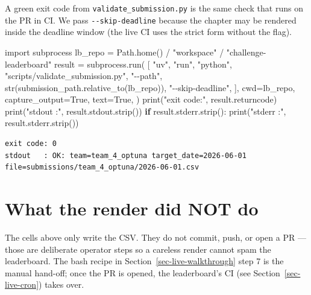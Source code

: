 \documentclass[
  english,
  letterpaper,
]{scrbook}
\newenvironment{Shaded}{\begin{snugshade}}{\end{snugshade}}
\newcommand{\BuiltInTok}[1]{\textcolor[rgb]{0.00,0.23,0.31}{#1}}
\newcommand{\ControlFlowTok}[1]{\textcolor[rgb]{0.00,0.23,0.31}{\textbf{#1}}}
\newcommand{\ImportTok}[1]{\textcolor[rgb]{0.00,0.46,0.62}{#1}}
\newcommand{\NormalTok}[1]{\textcolor[rgb]{0.00,0.23,0.31}{#1}}
\newcommand{\OperatorTok}[1]{\textcolor[rgb]{0.37,0.37,0.37}{#1}}
\newcommand{\StringTok}[1]{\textcolor[rgb]{0.13,0.47,0.30}{#1}}
\newcommand{\VariableTok}[1]{\textcolor[rgb]{0.07,0.07,0.07}{#1}}
\begin{document}
A green exit code from \texttt{validate\_submission.py} is the same
check that runs on the PR in CI. We pass \texttt{-\/-skip-deadline}
because the chapter may be rendered inside the deadline window (the live
CI uses the strict form without the flag).

\protect{}\label{live-validate}
\begin{Shaded}
\begin{Highlighting}[]
\ImportTok{import}\NormalTok{ subprocess}
\NormalTok{lb\_repo }\OperatorTok{=}\NormalTok{ Path.home() }\OperatorTok{/} \StringTok{"workspace"} \OperatorTok{/} \StringTok{"challenge{-}leaderboard"}
\NormalTok{result }\OperatorTok{=}\NormalTok{ subprocess.run(}
\NormalTok{    [}
        \StringTok{"uv"}\NormalTok{, }\StringTok{"run"}\NormalTok{, }\StringTok{"python"}\NormalTok{, }\StringTok{"scripts/validate\_submission.py"}\NormalTok{,}
        \StringTok{"{-}{-}path"}\NormalTok{, }\BuiltInTok{str}\NormalTok{(submission\_path.relative\_to(lb\_repo)),}
        \StringTok{"{-}{-}skip{-}deadline"}\NormalTok{,}
\NormalTok{    ],}
\NormalTok{    cwd}\OperatorTok{=}\NormalTok{lb\_repo,}
\NormalTok{    capture\_output}\OperatorTok{=}\VariableTok{True}\NormalTok{,}
\NormalTok{    text}\OperatorTok{=}\VariableTok{True}\NormalTok{,}
\NormalTok{)}
\BuiltInTok{print}\NormalTok{(}\StringTok{"exit code:"}\NormalTok{, result.returncode)}
\BuiltInTok{print}\NormalTok{(}\StringTok{"stdout   :"}\NormalTok{, result.stdout.strip())}
\ControlFlowTok{if}\NormalTok{ result.stderr.strip():}
    \BuiltInTok{print}\NormalTok{(}\StringTok{"stderr   :"}\NormalTok{, result.stderr.strip())}
\end{Highlighting}
\end{Shaded}

\begin{verbatim}
exit code: 0
stdout   : OK: team=team_4_optuna target_date=2026-06-01 file=submissions/team_4_optuna/2026-06-01.csv
\end{verbatim}

\section{What the render did NOT do}\label{sec-live-not-rendered}

The cells above only write the CSV. They do not commit, push, or open a
PR --- those are deliberate operator steps so a careless render cannot
spam the leaderboard. The bash recipe in
Section~\ref{sec-live-walkthrough} step 7 is the manual hand-off; once
the PR is opened, the leaderboard's CI (see Section~\ref{sec-live-cron})
takes over.
\end{document}
